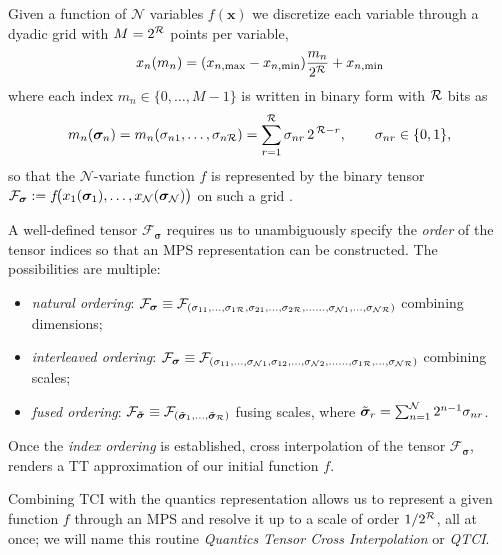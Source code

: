 Given a function of $\mathcal{N}$ variables $f(\boldsymbol{x})$ we discretize each variable through a dyadic grid with \(M=2^{\mathcal{R}}\) points per variable, 
\begin{equation}
	x_n(m_n) = (x_{n,\text{max}} - x_{n,\text{min}})\frac{m_n}{2^{\mathcal{R}}} + x_{n,\text{min}}
	\label{eq:quanticsGrid}
\end{equation}
where each index \(m_n\in\{0,\dots,M-1\}\) is written in binary form with $\mathcal{R}$ bits as 
\begin{equation}
	m_n(\boldsymbol{\sigma}_n)  = m_n(\sigma_{n1},\dots,\sigma_{n\mathcal{R}})=\sum_{r=1}^{\mathcal{R}}\sigma_{nr}\,2^{\,\mathcal{R}-r},\quad 
\quad \sigma_{nr}\in\{0,1\},
\label{eq:quanticsRepr}
\end{equation}
so that the \(\mathcal{N}\)-variate function \(f\) is represented by the binary tensor \(\mathcal{F}_{\boldsymbol{\sigma}}:=f\!\bigl(x_1(\boldsymbol{\sigma}_1),\dots,x_{\mathcal{N}}(\boldsymbol{\sigma}_{\mathcal{N}})\bigr)\) on such a grid \cite{Khoromskij2011, Hiroshi2023}.

A well-defined tensor \(\mathcal{F}_{\boldsymbol{\sigma}}\) requires us to unambiguously specify the \textit{order} of the tensor indices so that an MPS representation can be constructed. The possibilities are multiple:
\begin{itemize}
	\item \textit{natural ordering}: $\mathcal{F}_{\boldsymbol{\sigma}} \equiv \mathcal{F}_{(\sigma_{11},\dots,\sigma_{1\mathcal{R}},\sigma_{21},\dots,\sigma_{2\mathcal{R}}, \dots\dots,\sigma_{\mathcal{N}1},\dots,\sigma_{\mathcal{N}\mathcal{R}})}$ combining dimensions;
	\item \textit{interleaved ordering}: $\mathcal{F}_{\boldsymbol{\sigma}} \equiv \mathcal{F}_{(\sigma_{11},\dots,\sigma_{\mathcal{N}1},\sigma_{12},\dots,\sigma_{\mathcal{N}2}, \dots\dots,\sigma_{1\mathcal{R}},\dots,\sigma_{\mathcal{N}\mathcal{R}})}$ combining scales;
	\item \textit{fused ordering}: $\mathcal{F}_{\tilde {\boldsymbol{\sigma}}} \equiv \mathcal{F}_{({\tilde {\boldsymbol{\sigma}}}_{1},\dots,{\tilde {\boldsymbol{\sigma}}}_{\mathcal{R}})}$ fusing scales, where ${\tilde {\boldsymbol{\sigma}}}_r = \sum_{n=1}^{\mathcal{N}} 2^{n-1}\sigma_{nr}$.
\end{itemize} 
Once the \textit{index ordering} is established, cross interpolation of the tensor \(\mathcal{F}_{\boldsymbol{\sigma}}\), renders a TT approximation of our initial function $f$. 

Combining TCI with the quantics representation allows us to represent a given function $f$ through an MPS and resolve it up to a scale of order $1/2^{\mathcal{R}}$, all at once; we will name this routine \textit{Quantics Tensor Cross Interpolation} or \textit{QTCI}. 

